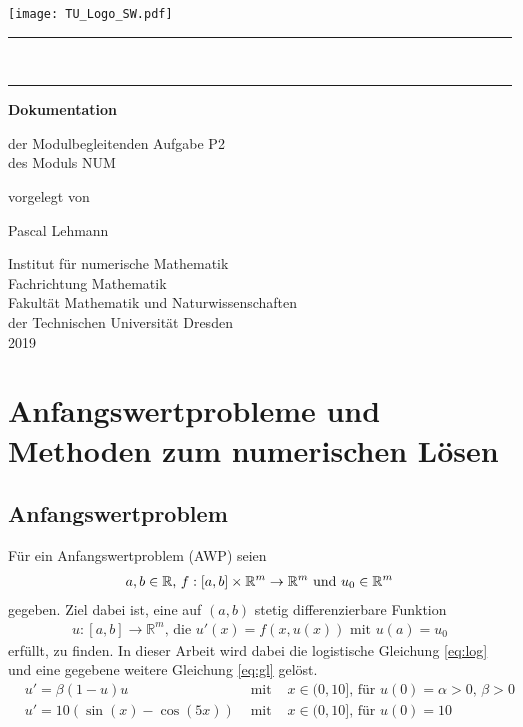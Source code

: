 \documentclass[
paper=A4,fontsize=12pt,
BCOR=15mm,DIV=22,
headinclude=true,footinclude=false,
parskip=full,
numbers=noendperiod,
ngerman,fleqn,             %
bibliography=totoc, %
toc=listof, %
cleardoublepage=empty,      %
version = last
]{scrartcl}
\newcommand{\R}{\mathbb{R}}
\begin{document}

\begin{titlepage}
	{
		\flushleft\texttt{[image: TU\_Logo\_SW.pdf]}\\[-2mm]
		\rule{\textwidth}{0.5pt}\\[-3.7mm]
		\rule{\textwidth}{0.5pt}
	}
	
	\centering\large
	{\huge\bfseries Dokumentation}
	
	{der Modulbegleitenden Aufgabe P2\\
		des Moduls NUM
	}
	
	vorgelegt von
	
	{\Large Pascal Lehmann}
	
	Institut für numerische Mathematik\\
	Fachrichtung Mathematik\\
	Fakultät Mathematik und Naturwissenschaften\\
	der Technischen Universität Dresden\\
	2019
\end{titlepage}


\setcounter{page}{1}

\tableofcontents
\clearpage

\setcounter{page}{1}

\section{Anfangswertprobleme und Methoden zum numerischen Lösen}
\subsection{Anfangswertproblem}
Für ein Anfangswertproblem (AWP) seien
\begin{align}
\notag 
a,b\in \R\text{, } f:[a,b]\times\R^m\to\R^m \text{ und } u_0\in\R^m
\end{align}
gegeben.
Ziel dabei ist, eine auf $(a,b)$ stetig differenzierbare Funktion 
\begin{align}
\label{eq:AWP}
u:[a,b]\to\R^m \text{, die } u'(x)=f(x,u(x)) \text{ mit } u(a)=u_0
\end{align}
erfüllt, zu finden.
In dieser Arbeit wird dabei die logistische Gleichung \eqref{eq:log} und eine gegebene weitere Gleichung \eqref{eq:gl} gelöst.
\begin{align}
\label{eq:log}
& u'=\beta (1-u)u & \text{ mit } & x\in (0,10] \text{, für }u(0)=\alpha > 0 \text{, } \beta > 0 \\
\label{eq:gl}
&u'=10(\sin(x)-\cos(5x))& \text{ mit }& x\in (0,10] \text{, für } u(0)= 10 
\end{align}
\end{document}
